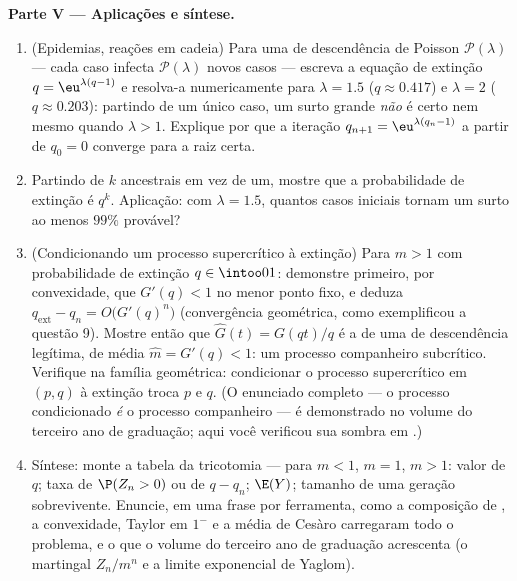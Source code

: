 \begin{problem}
\medskip
\noindent\textbf{Parte V --- Aplicações e síntese.}
\begin{enumerate}[resume]
  \item (Epidemias, reações em cadeia) Para uma  de descendência
        de Poisson $\mathcal P(\lambda)$ --- cada caso infecta
        $\mathcal P(\lambda)$ novos casos --- escreva a
        equação de extinção $q = \eu^{\lambda(q-1)}$ e
        resolva-a numericamente para $\lambda = 1.5$ ($q \approx
        0.417$) e $\lambda = 2$ ($q \approx 0.203$):
        partindo de um único caso, um surto grande \emph{não}
        é certo nem mesmo quando $\lambda > 1$. Explique
        por que a iteração $q_{n+1} = \eu^{\lambda(q_n - 1)}$
        a partir de $q_0 = 0$ converge para a raiz certa.
  \item Partindo de $k$ ancestrais em vez de um, mostre que
        a probabilidade de extinção é $q^k$. Aplicação:
        com $\lambda = 1.5$, quantos casos iniciais tornam um
        surto ao menos $99\%$ provável?
  \item (Condicionando um processo supercrítico à extinção)
        Para $m > 1$ com probabilidade de extinção $q \in
        \intoo01$: demonstre primeiro, por convexidade, que $G'(q) < 1$
        no menor ponto fixo, e deduza
        $q_{\mathrm{ext}} - q_n = O\bigl(G'(q)^n\bigr)$
        (convergência geométrica, como exemplificou a questão 9).
        Mostre então que $\widehat G(t) = G(qt)/q$ é a 
        de uma  de descendência legítima, de média $\widehat m =
        G'(q) < 1$: um processo companheiro subcrítico. Verifique
        na família geométrica: condicionar o processo
        supercrítico em $(p, q)$ à extinção troca
        $p$ e $q$. (O enunciado completo --- o processo condicionado
        \emph{é} o processo companheiro --- é demonstrado
        no volume do terceiro ano de graduação; aqui você verificou sua
        sombra em .)
  \item Síntese: monte a tabela da tricotomia --- para $m <
        1$, $m = 1$, $m > 1$: valor de $q$; taxa de $\P(Z_n >
        0)$ ou de $q - q_n$; $\E(Y)$; tamanho de uma geração
        sobrevivente. Enuncie, em uma frase por ferramenta, como
        a composição de , a convexidade, Taylor em $1^-$ e
        a média de Cesàro carregaram todo o problema, e o que
        o volume do terceiro ano de graduação acrescenta (o martingal $Z_n/m^n$ e
        a  limite exponencial de Yaglom).
\end{enumerate}
\end{problem}

